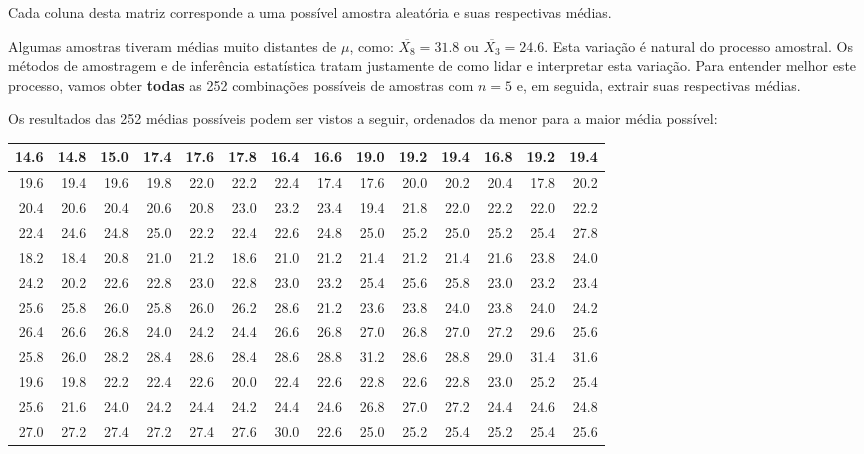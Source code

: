 \documentclass[
]{book}
\begin{document}
Cada coluna desta matriz corresponde a uma possível amostra aleatória e suas respectivas médias.

Algumas amostras tiveram médias muito distantes de \(\mu\), como: \(\overline{X_{8}} = 31.8\) ou \(\overline{X_{3}} = 24.6\). Esta variação é natural do processo amostral. Os métodos de amostragem e de inferência estatística tratam justamente de como lidar e interpretar esta variação. Para entender melhor este processo, vamos obter \textbf{todas} as 252 combinações possíveis de amostras com \(n = 5\) e, em seguida, extrair suas respectivas médias.

Os resultados das 252 médias possíveis podem ser vistos a seguir, ordenados da menor para a maior média possível:

\begin{tabular}{r|r|r|r|r|r|r|r|r|r|r|r|r|r}
\hline
14.6 & 14.8 & 15.0 & 17.4 & 17.6 & 17.8 & 16.4 & 16.6 & 19.0 & 19.2 & 19.4 & 16.8 & 19.2 & 19.4\\
\hline
19.6 & 19.4 & 19.6 & 19.8 & 22.0 & 22.2 & 22.4 & 17.4 & 17.6 & 20.0 & 20.2 & 20.4 & 17.8 & 20.2\\
\hline
20.4 & 20.6 & 20.4 & 20.6 & 20.8 & 23.0 & 23.2 & 23.4 & 19.4 & 21.8 & 22.0 & 22.2 & 22.0 & 22.2\\
\hline
22.4 & 24.6 & 24.8 & 25.0 & 22.2 & 22.4 & 22.6 & 24.8 & 25.0 & 25.2 & 25.0 & 25.2 & 25.4 & 27.8\\
\hline
18.2 & 18.4 & 20.8 & 21.0 & 21.2 & 18.6 & 21.0 & 21.2 & 21.4 & 21.2 & 21.4 & 21.6 & 23.8 & 24.0\\
\hline
24.2 & 20.2 & 22.6 & 22.8 & 23.0 & 22.8 & 23.0 & 23.2 & 25.4 & 25.6 & 25.8 & 23.0 & 23.2 & 23.4\\
\hline
25.6 & 25.8 & 26.0 & 25.8 & 26.0 & 26.2 & 28.6 & 21.2 & 23.6 & 23.8 & 24.0 & 23.8 & 24.0 & 24.2\\
\hline
26.4 & 26.6 & 26.8 & 24.0 & 24.2 & 24.4 & 26.6 & 26.8 & 27.0 & 26.8 & 27.0 & 27.2 & 29.6 & 25.6\\
\hline
25.8 & 26.0 & 28.2 & 28.4 & 28.6 & 28.4 & 28.6 & 28.8 & 31.2 & 28.6 & 28.8 & 29.0 & 31.4 & 31.6\\
\hline
19.6 & 19.8 & 22.2 & 22.4 & 22.6 & 20.0 & 22.4 & 22.6 & 22.8 & 22.6 & 22.8 & 23.0 & 25.2 & 25.4\\
\hline
25.6 & 21.6 & 24.0 & 24.2 & 24.4 & 24.2 & 24.4 & 24.6 & 26.8 & 27.0 & 27.2 & 24.4 & 24.6 & 24.8\\
\hline
27.0 & 27.2 & 27.4 & 27.2 & 27.4 & 27.6 & 30.0 & 22.6 & 25.0 & 25.2 & 25.4 & 25.2 & 25.4 & 25.6\\

\end{tabular}
\end{document}
